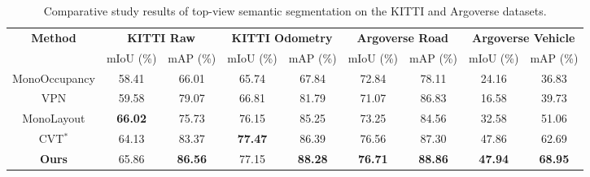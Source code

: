\begin{table*}[!t]
\caption{Comparative study results of top-view semantic segmentation on the KITTI and Argoverse datasets.}
\label{tb:result_comparative}
\begin{center}
\begin{small}
\begin{tabular}{ccccccccc}
\toprule
\multicolumn{1}{c}{\multirow{2}[2]{*}{\textbf{Method}}} & \multicolumn{2}{c}{\textbf{KITTI Raw}} & \multicolumn{2}{c}{\textbf{KITTI Odometry}} & \multicolumn{2}{c}{\textbf{Argoverse Road}} & \multicolumn{2}{c}{\textbf{Argoverse Vehicle}} \\ 
\cmidrule(lr){2-5}
\cmidrule(lr){6-9}
 & mIoU (\%) & mAP (\%) & mIoU (\%) & mAP (\%) & mIoU (\%) & mAP (\%) & mIoU (\%) & mAP (\%) \\

\midrule

MonoOccupancy \cite{lu2019monocular} & 58.41 & 66.01 & 65.74 & 67.84 & 72.84 & 78.11 & 24.16 & 36.83\\
VPN \cite{pan2020cross} & 59.58 & 79.07 & 66.81 & 81.79 & 71.07 & 86.83 & 16.58 & 39.73 \\
MonoLayout \cite{mani2020monolayout} & \textbf{66.02} & 75.73 & 76.15 & 85.25 & 73.25 & 84.56 & 32.58 & 51.06\\
CVT$^{*}$ \cite{yang2021projecting} & 64.13 & 83.37 & \textbf{77.47} & 86.39 & 76.56 & 87.30 & 47.86 & 62.69\\
\midrule

\textbf{Ours}& 65.86&  \textbf{86.56}&  77.15& \textbf{88.28} & \textbf{76.71}&  \textbf{88.86}& \textbf{47.94} & \textbf{68.95}\\

\bottomrule
\end{tabular}
\end{small}
\end{center}
\end{table*}
